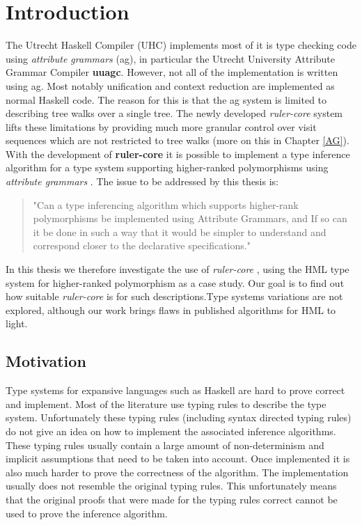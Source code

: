 \documentclass[twoside, titlepage, openright, a4paper]{book}
\newcommand{\ags}{\emph{attribute grammars }}
\newcommand{\rcore}{\emph{ruler-core }}
\begin{document}





\newpage
\thispagestyle{headings}
\mbox{}

\tableofcontents

\chapter{Introduction}
The Utrecht Haskell Compiler (UHC\cite{UHC}) implements most of it is type checking code using \ags (ag), in particular the Utrecht University Attribute Grammar Compiler \textbf{uuagc}\cite{uuagc}. However, not all of the implementation is written using ag. Most notably unification and context reduction are implemented as normal Haskell code. The reason for this is that the ag system is limited to describing tree walks over a single tree. The newly developed \rcore system lifts these limitations by providing much more granular control over visit sequences which are not restricted to tree walks (more on this in Chapter \ref{AG}). With the development of \textbf{ruler-core}\cite{ruler-front} it is possible to implement a type inference algorithm for a type system supporting higher-ranked polymorphisms using \ags. The issue to be addressed by this thesis is:

\begin{quotation}
"Can a type inferencing algorithm which supports higher-rank polymorphisms be implemented using Attribute Grammars, and If so can it be done in such a way that it would be simpler to understand and correspond closer to the declarative specifications."
\end{quotation}

In this thesis we therefore investigate the use of \rcore, using the HML type system  for higher-ranked polymorphism as a case study. Our goal is to find out how suitable \rcore is for such descriptions.Type systems variations are not explored, although our work brings flaws in published algorithms for HML to light.

\section{Motivation}
Type systems for expansive languages such as Haskell are hard to prove correct and implement. Most of the literature use typing rules to describe the type system. Unfortunately these typing rules (including syntax directed typing rules) do not give an idea on how to implement the associated inference algorithms. These typing rules usually contain a large amount of non-determinism and implicit assumptions that need to be taken into account.
Once implemented it is also much harder to prove the correctness of the algorithm. The implementation usually does not resemble the original typing rules. This unfortunately means that the original proofs that were made for the typing rules correct cannot be used to prove the inference algorithm.
\end{document}
